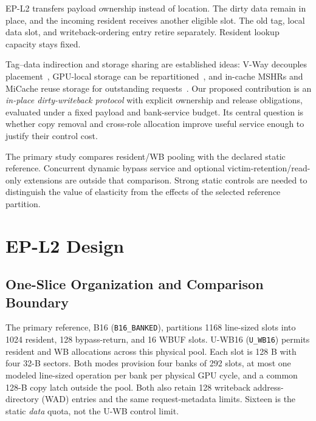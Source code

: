 \documentclass[conference,letterpaper]{IEEEtran}
\newcommand{\epl}{EP-L2}
\newcommand{\base}{B16}
\newcommand{\unif}{U-WB16}
\begin{document}
\epl{} transfers payload ownership instead of location. The dirty data remain in place, and the incoming resident receives another eligible slot. The old tag, local data slot, and writeback-ordering entry retire separately. Resident lookup capacity stays fixed.

Tag--data indirection and storage sharing are established ideas: V-Way decouples placement~\cite{vway}, GPU-local storage can be repartitioned~\cite{unified}, and in-cache MSHRs and MiCache reuse storage for outstanding requests~\cite{farkas,micache}. Our proposed contribution is an \emph{in-place dirty-writeback protocol} with explicit ownership and release obligations, evaluated under a fixed payload and bank-service budget. Its central question is whether copy removal and cross-role allocation improve useful service enough to justify their control cost.

The primary study compares resident/WB pooling with the declared static reference. Concurrent dynamic bypass service and optional victim-retention/read-only extensions are outside that comparison. Strong static controls are needed to distinguish the value of elasticity from the effects of the selected reference partition.

\section{EP-L2 Design}
\subsection{One-Slice Organization and Comparison Boundary}
The primary reference, \base{} (\texttt{B16\_BANKED}), partitions 1168 line-sized slots into 1024 resident, 128 bypass-return, and 16 WBUF slots. \unif{} (\texttt{U\_WB16}) permits resident and WB allocations across this physical pool. Each slot is 128 B with four 32-B sectors. Both modes provision four banks of 292 slots, at most one modeled line-sized operation per bank per physical GPU cycle, and a common 128-B copy latch outside the pool. Both also retain 128 writeback address-directory (WAD) entries and the same request-metadata limits. Sixteen is the static \emph{data} quota, not the U-WB control limit.
\end{document}
